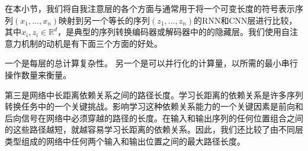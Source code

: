 

在本小节，我们将自我注意层的各个方面与通常用于将一个可变长度的符号表示序列$(x_1, ..., x_n)$映射到另一个等长的序列$(z_1, ..., z_n)$的RNN和CNN层进行比较，其中$x_i, z_i \in \mathbb{R}^d$，是典型的序列转换编码器或解码器中的的隐藏层。我们使用自注意力机制的动机是有下面三个方面的好处。


一个是每层的总计算复杂性。
另一个是可以并行化的计算量，以所需的最小串行操作数量来衡量。



第三是网络中长距离依赖关系之间的路径长度。学习长距离的依赖关系是许多序列转换任务中的一个关键挑战。影响学习这种依赖关系能力的一个关键因素是前向和后向信号在网络中必须穿越的路径的长度。在输入和输出序列的任何位置组合之间的这些路径越短，就越容易学习长距离的依赖关系。因此，我们还比较了由不同层类型组成的网络中任何两个输入和输出位置之间的最大路径长度。


